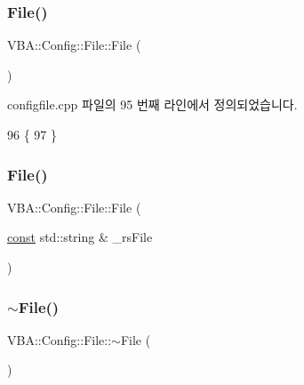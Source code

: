 \subsubsection{\texorpdfstring{File()}{File()}\hspace{0.1cm}{\footnotesize\ttfamily [1/2]}}
{\footnotesize\ttfamily V\+B\+A\+::\+Config\+::\+File\+::\+File (\begin{DoxyParamCaption}{ }\end{DoxyParamCaption})}



configfile.\+cpp 파일의 95 번째 라인에서 정의되었습니다.


\begin{DoxyCode}
96 \{
97 \}
\end{DoxyCode}
\mbox{\label{class_v_b_a_1_1_config_1_1_file_a5f76dd130a9c0eff526dfd0fbeaa9e44}} 
\subsubsection{\texorpdfstring{File()}{File()}\hspace{0.1cm}{\footnotesize\ttfamily [2/2]}}
{\footnotesize\ttfamily V\+B\+A\+::\+Config\+::\+File\+::\+File (\begin{DoxyParamCaption}\item[{\mbox{\hyperlink{getopt1_8c_a2c212835823e3c54a8ab6d95c652660e}{const}} std\+::string \&}]{\+\_\+rs\+File }\end{DoxyParamCaption})}

\mbox{\label{class_v_b_a_1_1_config_1_1_file_a450d205e5b9934238ab8bb9dee54ec52}} 
\subsubsection{\texorpdfstring{$\sim$\+File()}{~File()}}
{\footnotesize\ttfamily V\+B\+A\+::\+Config\+::\+File\+::$\sim$\+File (\begin{DoxyParamCaption}{ }\end{DoxyParamCaption})\hspace{0.3cm}{\ttfamily [virtual]}}




